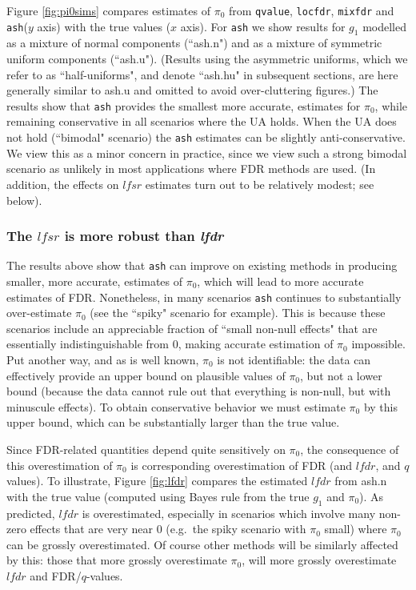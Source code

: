 \documentclass[11pt]{article}
\def\lfdr{\textit{lfdr}}
\def\lfsr{\textit{lfsr}}
\def\qvalue{{\tt qvalue}\xspace}
\def\locfdr{{\tt locfdr}\xspace}
\def\mixfdr{{\tt mixfdr}\xspace}
\def\ash{{\tt ash}\xspace}
\begin{document}
Figure \ref{fig:pi0sims} compares estimates of $\pi_0$ from \qvalue, \locfdr, \mixfdr and \ash ($y$ axis) with the true values ($x$ axis). 
For \ash we show results for $g_1$ modelled as a mixture of normal components (``ash.n") 
and as a mixture of symmetric uniform components (``ash.u"). (Results using the asymmetric uniforms, which we refer to
as ``half-uniforms", and denote ``ash.hu" in subsequent sections, are here generally similar to ash.u and omitted to avoid over-cluttering figures.)
The results show that \ash provides the smallest more accurate, estimates for $\pi_0$, while remaining conservative
in all scenarios where the UA holds. When the UA does not hold (``bimodal" scenario) the \ash estimates can be slightly anti-conservative.
We view this as a minor concern in practice, since we view such a strong bimodal scenario as unlikely in most applications where FDR methods
are used. (In addition, the effects on $\lfsr$ estimates turn out to be relatively modest; see below). 


\subsubsection*{The $\lfsr$ is more robust than \lfdr}

The results above show that \ash can improve on existing methods in producing smaller, more accurate, 
estimates of $\pi_0$, which will lead to more accurate estimates of FDR.
Nonetheless, in many scenarios \ash continues
to substantially over-estimate $\pi_0$ (see the ``spiky" scenario for example). 
This is because these scenarios include 
an appreciable fraction of ``small non-null effects" that are essentially indistinguishable from 0, making accurate
estimation of $\pi_0$ impossible. Put another way, and as is well known, $\pi_0$ is not identifiable:
 the data can effectively provide an upper bound on plausible values of $\pi_0$,
but not a lower bound (because the data cannot rule out that everything is non-null, but with minuscule effects).
To obtain conservative behavior we must estimate $\pi_0$ by this upper bound, which can
be substantially larger than the true value. 

Since FDR-related quantities depend quite sensitively on $\pi_0$, the consequence of this 
overestimation of $\pi_0$ is corresponding overestimation of FDR (and $\lfdr$, and $q$ values).
To illustrate, Figure \ref{fig:lfdr} compares the estimated $\lfdr$ from ash.n with the true value (computed using
Bayes rule from the true $g_1$ and $\pi_0$). As predicted, $\lfdr$ is overestimated, especially in scenarios which involve many
non-zero effects that are very near 0 (e.g.~the spiky scenario with $\pi_0$ small) where
$\pi_0$ can be grossly overestimated.  
Of course other methods will be similarly affected by this: those that more grossly overestimate $\pi_0$, will more grossly overestimate $\lfdr$ and FDR/$q$-values.
\end{document}
